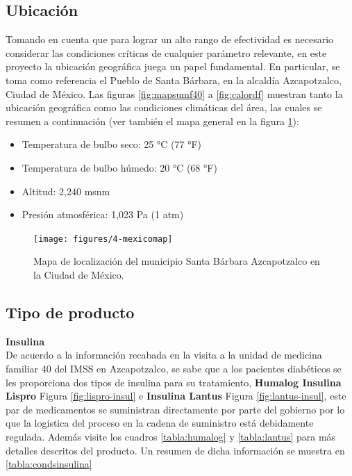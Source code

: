 \subsection{Ubicación}
Tomando en cuenta que para lograr un alto rango de efectividad es necesario considerar las condiciones críticas de cualquier parámetro relevante, en este proyecto la ubicación geográfica juega un papel fundamental. En particular, se toma como referencia el Pueblo de Santa Bárbara, en la alcaldía Azcapotzalco, Ciudad de México. Las figuras  \ref{fig:mapsumf40} a \ref{fig:calordf} muestran tanto la ubicación geográfica como las condiciones climáticas del área, las cuales se resumen a continuación (ver también el mapa general en la figura \ref{fig:4-mexicomap}):


\begin{itemize}
	\item Temperatura de bulbo seco: 25 °C (77 °F)\rspitems
	\item Temperatura de bulbo húmedo: 20 °C (68 °F)	\rspitems
	\item Altitud: 2,240 msnm \rspitems
	\item Presión atmosférica: 1,023 Pa (1 atm)\rspitems
\end{itemize}

\begin{figure}[H]
	\centering
	\texttt{[image: figures/4-mexicomap]}
	\caption{Mapa de localización del municipio Santa Bárbara Azcapotzalco en la Ciudad de México.}\cite{semovi-24}
	\label{fig:4-mexicomap}
\end{figure}

\subsection{Tipo de producto}
\textbf{Insulina}\\
De acuerdo a la información recabada en la visita a la unidad  de medicina familiar 40 del IMSS en Azcapotzalco, se sabe que a los pacientes diabéticos se les proporciona dos tipos de insulina para su tratamiento, \textbf{Humalog Insulina Lispro} Figura \ref{fig:lispro-insul} e \textbf{Insulina Lantus}  Figura \ref{fig:lantus-insul}, este par de medicamentos se suministran directamente por parte del gobierno por lo que la logistica del proceso en la cadena de suministro está debidamente regulada. Además visite los cuadros \ref{tabla:humalog} y \ref{tabla:lantus} para más detalles descritos del producto. Un resumen de dicha información se muestra en \ref{tabla:condsinsulina}

